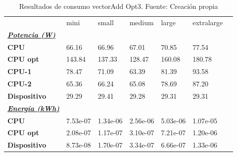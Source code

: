 \begin{table}[H]
    \centering
    \begin{tabular}{lllllll}
    \rowcolor[HTML]{DAE8FC} \ & mini & small & medium & 	large & 	extralarge \\
    \cellcolor[HTML]{DAE8FC} \textbf{\textbf{{\emph{{\underline{{Potencia (W)}}}}}}} &  &  &  & 	 & 	 \\
    \rowcolor[HTML]{EFEFEF} \cellcolor[HTML]{DAE8FC} \textbf{CPU} & 66.16 & 66.96 & 67.01 & 	70.85 & 	77.54 \\
    \cellcolor[HTML]{DAE8FC} \textbf{CPU opt} & 143.84 & 137.33 & 128.47 & 	160.08 & 	180.78 \\
    \rowcolor[HTML]{EFEFEF} \cellcolor[HTML]{DAE8FC} \textbf{\quad CPU-1} & 78.47 & 71.09 & 63.39 & 	81.39 & 	93.58 \\
    \cellcolor[HTML]{DAE8FC} \textbf{\quad CPU-2} & 65.36 & 66.24 & 65.08 & 	78.69 & 	87.20 \\
    \rowcolor[HTML]{EFEFEF} \cellcolor[HTML]{DAE8FC} \textbf{Dispositivo} & 29.29 & 29.41 & 29.28 & 	29.31 & 	29.31 \\
    \cellcolor[HTML]{DAE8FC} \textbf{\textbf{{\emph{{\underline{{Energía (kWh)}}}}}}} &  &  &  & 	 & 	 \\
    \rowcolor[HTML]{EFEFEF} \cellcolor[HTML]{DAE8FC} \textbf{CPU} & 7.53e-07 & 1.34e-06 & 2.56e-06 & 	5.03e-06 & 	1.07e-05 \\
    \cellcolor[HTML]{DAE8FC} \textbf{CPU opt} & 2.08e-07 & 1.17e-07 & 3.10e-07 & 	7.21e-07 & 	1.20e-06 \\
    \rowcolor[HTML]{EFEFEF} \cellcolor[HTML]{DAE8FC} \textbf{Dispositivo} & 8.73e-08 & 1.70e-07 & 3.34e-07 & 	6.66e-07 & 	1.33e-06 \\
    \end{tabular}
    \caption[Resultados de consumo vectorAdd Opt3]{{Resultados de consumo vectorAdd Opt3. Fuente: Creación propia}}
    \label{table_test_vectorAdd_Opt3_hw_powerResults}
\end{table}